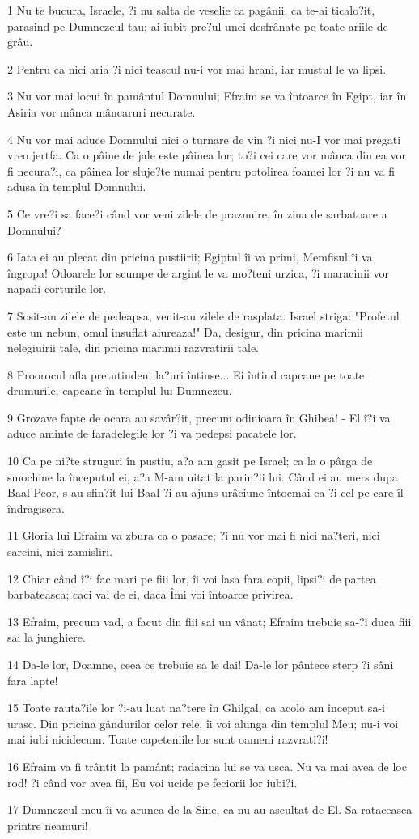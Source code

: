 \par 1 Nu te bucura, Israele, ?i nu salta de veselie ca pagânii, ca te-ai ticalo?it, parasind pe Dumnezeul tau; ai iubit pre?ul unei desfrânate pe toate ariile de grâu.
\par 2 Pentru ca nici aria ?i nici teascul nu-i vor mai hrani, iar mustul le va lipsi.
\par 3 Nu vor mai locui în pamântul Domnului; Efraim se va întoarce în Egipt, iar în Asiria vor mânca mâncaruri necurate.
\par 4 Nu vor mai aduce Domnului nici o turnare de vin ?i nici nu-I vor mai pregati vreo jertfa. Ca o pâine de jale este pâinea lor; to?i cei care vor mânca din ea vor fi necura?i, ca pâinea lor sluje?te numai pentru potolirea foamei lor ?i nu va fi adusa în templul Domnului.
\par 5 Ce vre?i sa face?i când vor veni zilele de praznuire, în ziua de sarbatoare a Domnului?
\par 6 Iata ei au plecat din pricina pustiirii; Egiptul îi va primi, Memfisul îi va îngropa! Odoarele lor scumpe de argint le va mo?teni urzica, ?i maracinii vor napadi corturile lor.
\par 7 Sosit-au zilele de pedeapsa, venit-au zilele de rasplata. Israel striga: "Profetul este un nebun, omul insuflat aiureaza!" Da, desigur, din pricina marimii nelegiuirii tale, din pricina marimii razvratirii tale.
\par 8 Proorocul afla pretutindeni la?uri întinse... Ei întind capcane pe toate drumurile, capcane în templul lui Dumnezeu.
\par 9 Grozave fapte de ocara au savâr?it, precum odinioara în Ghibea! - El î?i va aduce aminte de faradelegile lor ?i va pedepsi pacatele lor.
\par 10 Ca pe ni?te struguri în pustiu, a?a am gasit pe Israel; ca la o pârga de smochine la începutul ei, a?a M-am uitat la parin?ii lui. Când ei au mers dupa Baal Peor, s-au sfin?it lui Baal ?i au ajuns urâciune întocmai ca ?i cel pe care îl îndragisera.
\par 11 Gloria lui Efraim va zbura ca o pasare; ?i nu vor mai fi nici na?teri, nici sarcini, nici zamisliri.
\par 12 Chiar când î?i fac mari pe fiii lor, îi voi lasa fara copii, lipsi?i de partea barbateasca; caci vai de ei, daca Îmi voi întoarce privirea.
\par 13 Efraim, precum vad, a facut din fiii sai un vânat; Efraim trebuie sa-?i duca fiii sai la junghiere.
\par 14 Da-le lor, Doamne, ceea ce trebuie sa le dai! Da-le lor pântece sterp ?i sâni fara lapte!
\par 15 Toate rauta?ile lor ?i-au luat na?tere în Ghilgal, ca acolo am început sa-i urasc. Din pricina gândurilor celor rele, îi voi alunga din templul Meu; nu-i voi mai iubi nicidecum. Toate capeteniile lor sunt oameni razvrati?i!
\par 16 Efraim va fi trântit la pamânt; radacina lui se va usca. Nu va mai avea de loc rod! ?i când vor avea fii, Eu voi ucide pe feciorii lor iubi?i.
\par 17 Dumnezeul meu îi va arunca de la Sine, ca nu au ascultat de El. Sa rataceasca printre neamuri!

